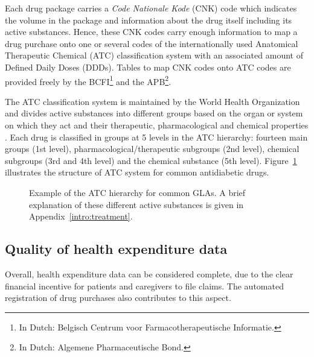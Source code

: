 Each drug package carries a \emph{Code Nationale Kode} (CNK) code which indicates the volume in the package and information about the drug itself including its active substances. Hence, these CNK codes carry enough information to map a drug purchase onto one or several codes of the internationally used Anatomical Therapeutic Chemical (ATC) classification system with an associated amount of Defined Daily Doses (DDDs). Tables to map CNK codes onto ATC codes are provided freely by the BCFI\footnote{In Dutch: Belgisch Centrum voor Farmacotherapeutische Informatie.} and the APB\footnote{In Dutch: Algemene Pharmaceutische Bond.}.

The ATC classification system is maintained by the World Health Organization and divides active substances into different groups based on the organ or system on which they act and their therapeutic, pharmacological and chemical properties \citep{world1996guidelines}. Each drug is classified in groups at 5 levels in the ATC hierarchy: fourteen main groups (1st level), pharmacological/therapeutic subgroups (2nd level), chemical subgroups (3rd and 4th level) and the chemical substance (5th level). Figure~\ref{intro:atc-example} illustrates the structure of ATC system for common antidiabetic drugs.

\begin{figure}[!h]
\caption{Example of the ATC hierarchy for common GLAs. A brief explanation of these different active substances is given in Appendix~\ref{intro:treatment}.} \label{intro:atc-example}
\end{figure}


\subsection{Quality of health expenditure data} \label{cmdata-quality}
Overall, health expenditure data can be considered complete, due to the clear financial incentive for patients and caregivers to file claims. The automated registration of drug purchases also contributes to this aspect.


